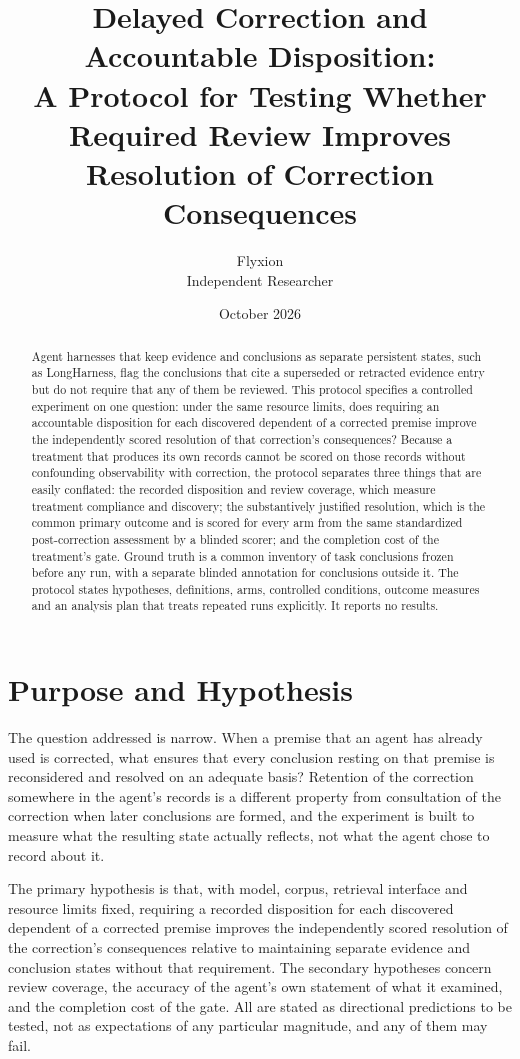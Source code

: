 \documentclass[11pt]{article}
\title{Delayed Correction and Accountable Disposition:\\
A Protocol for Testing Whether Required Review Improves Resolution of Correction Consequences}
\author{Flyxion\\Independent Researcher}
\date{October 2026}
\begin{document}
\maketitle

\begin{abstract}
\noindent
Agent harnesses that keep evidence and conclusions as separate persistent states, such as LongHarness, flag the conclusions that cite a superseded or retracted evidence entry but do not require that any of them be reviewed. This protocol specifies a controlled experiment on one question: under the same resource limits, does requiring an accountable disposition for each discovered dependent of a corrected premise improve the independently scored resolution of that correction's consequences? Because a treatment that produces its own records cannot be scored on those records without confounding observability with correction, the protocol separates three things that are easily conflated: the recorded disposition and review coverage, which measure treatment compliance and discovery; the substantively justified resolution, which is the common primary outcome and is scored for every arm from the same standardized post-correction assessment by a blinded scorer; and the completion cost of the treatment's gate. Ground truth is a common inventory of task conclusions frozen before any run, with a separate blinded annotation for conclusions outside it. The protocol states hypotheses, definitions, arms, controlled conditions, outcome measures and an analysis plan that treats repeated runs explicitly. It reports no results.
\end{abstract}

\section{Purpose and Hypothesis}\label{sec:purpose}

The question addressed is narrow. When a premise that an agent has already used is corrected, what ensures that every conclusion resting on that premise is reconsidered and resolved on an adequate basis? Retention of the correction somewhere in the agent's records is a different property from consultation of the correction when later conclusions are formed, and the experiment is built to measure what the resulting state actually reflects, not what the agent chose to record about it.

The primary hypothesis is that, with model, corpus, retrieval interface and resource limits fixed, requiring a recorded disposition for each discovered dependent of a corrected premise improves the independently scored resolution of the correction's consequences relative to maintaining separate evidence and conclusion states without that requirement. The secondary hypotheses concern review coverage, the accuracy of the agent's own statement of what it examined, and the completion cost of the gate. All are stated as directional predictions to be tested, not as expectations of any particular magnitude, and any of them may fail.
\end{document}
